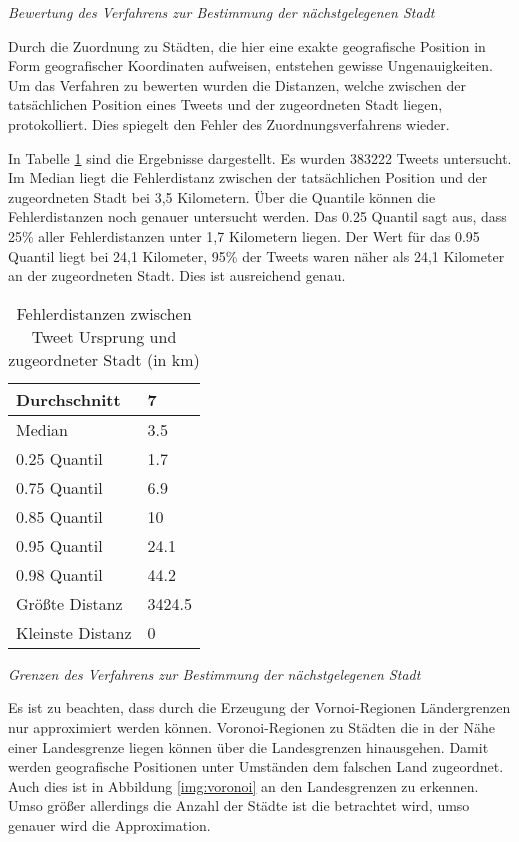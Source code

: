 			\textit{Bewertung des Verfahrens zur Bestimmung der nächstgelegenen Stadt}

				Durch die Zuordnung zu Städten, die hier eine exakte geografische Position in Form geografischer Koordinaten aufweisen, entstehen gewisse Ungenauigkeiten.
				Um das Verfahren zu bewerten wurden die Distanzen, welche zwischen der tatsächlichen Position eines Tweets und der zugeordneten Stadt liegen, protokolliert. 
				Dies spiegelt den Fehler des Zuordnungsverfahrens wieder.

				In Tabelle \ref{tab:distances} sind die Ergebnisse dargestellt.
				Es wurden 383222 Tweets untersucht.
				Im Median liegt die Fehlerdistanz zwischen der tatsächlichen Position und der zugeordneten Stadt bei 3,5 Kilometern.
				Über die Quantile können die Fehlerdistanzen noch genauer untersucht werden.
				Das 0.25 Quantil sagt aus, dass 25\% aller Fehlerdistanzen unter 1,7 Kilometern liegen.
				Der Wert für das 0.95 Quantil liegt bei 24,1 Kilometer, 95\% der Tweets waren näher als 24,1 Kilometer an der zugeordneten Stadt. 
				Dies ist ausreichend genau. 

					\begin{table}[h]
					\centering
					\caption{Fehlerdistanzen zwischen Tweet Ursprung und zugeordneter Stadt (in km)}
					\label{tab:distances}
					\begin{tabular}{|l|l|}
					\hline
					Durchschnitt & 7      \\ \hline
					Median       & 3.5    \\ \hline
					0.25 Quantil & 1.7    \\ \hline
					0.75 Quantil & 6.9    \\ \hline
					0.85 Quantil & 10     \\ \hline
					0.95 Quantil & 24.1   \\ \hline
					0.98 Quantil & 44.2   \\ \hline
					Größte Distanz      & 3424.5 \\ \hline
					Kleinste Distanz     & 0     \\ \hline
					\end{tabular}
					\end{table}

			\textit{Grenzen des Verfahrens zur Bestimmung der nächstgelegenen Stadt}

				Es ist zu beachten, dass durch die Erzeugung der Vornoi-Regionen Ländergrenzen nur approximiert werden können. 
				Voronoi-Regionen zu Städten die in der Nähe einer Landesgrenze liegen können über die Landesgrenzen hinausgehen. 
				Damit werden geografische Positionen unter Umständen dem falschen Land zugeordnet.
				Auch dies ist in Abbildung \ref{img:voronoi} an den Landesgrenzen zu erkennen. 
				Umso größer allerdings die Anzahl der Städte ist die betrachtet wird, umso genauer wird die Approximation. 


